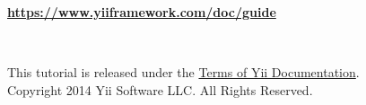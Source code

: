 \begin{titlepage}
    \setlength{\oddsidemargin}{-1in}
    \setlength{\evensidemargin}{-1in}
    \setlength{\textwidth}{\paperwidth}

    \vspace*{\fill}

    \noindent
    \parbox{\textwidth}{\centering \bfseries \Huge
        \formattedTitle
    }

    \vfill

    \noindent
    \parbox{\textwidth}{\centering \bfseries
        \url{https://www.yiiframework.com/doc/guide}
    }

    \vfill

    \noindent
    \parbox{\textwidth}{\centering \Large
        \formattedAuthors
        \\ \vspace{1cm}
        \formattedTranslators
    }

    \vspace*{\fill}

    \noindent
    \parbox{\textwidth}{\centering
        This tutorial is released under the \href{https://www.yiiframework.com/doc/terms/}{Terms of Yii Documentation}.\\
        \vspace{0.5cm}
        Copyright 2014 Yii Software LLC. All Rights Reserved.
    }
\end{titlepage}
